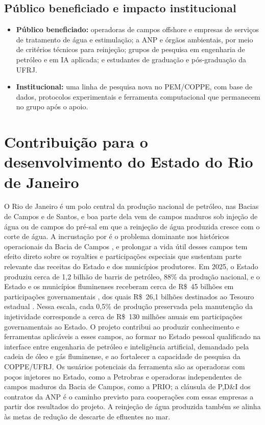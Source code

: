 \documentclass[10pt,a4paper]{article}
\newcommand{\itemedital}[1]{}
\begin{document}
\subsection{Público beneficiado e impacto institucional}\itemedital{Anexo 1 E}
\begin{itemize}
  \item \textbf{Público beneficiado:} operadoras de campos offshore e empresas de serviços de
        tratamento de água e estimulação; a ANP e órgãos ambientais, por meio de critérios
        técnicos para reinjeção; grupos de pesquisa em engenharia de petróleo e em IA aplicada;
        e estudantes de graduação e pós-graduação da UFRJ.
  \item \textbf{Institucional:} uma linha de pesquisa nova no PEM/COPPE, com base de dados,
        protocolos experimentais e ferramenta computacional que permanecem no grupo após o apoio.
\end{itemize}

\section{Contribuição para o desenvolvimento do Estado do Rio de Janeiro}\itemedital{2.16 XXII; critério 4}
O Rio de Janeiro é um polo central da produção nacional de petróleo, nas Bacias de
Campos e de Santos, e boa parte dela vem de campos maduros sob injeção de água ou de campos
do pré-sal em que a reinjeção de água produzida cresce com o corte de água. A incrustação por
 é o problema dominante nos históricos operacionais da Bacia de Campos
\cite{rocha2001,bezerra2004}, e prolongar a vida útil desses campos tem efeito direto sobre
os royalties e participações especiais que sustentam parte relevante das receitas do Estado e
dos municípios produtores. Em 2025, o Estado produziu cerca de 1,2 bilhão de barris de petróleo,
88\% da produção nacional, e o Estado e os municípios fluminenses receberam cerca de R\$~45 bilhões
em participações governamentais \cite{firjan2026anuario}, dos quais R\$~26,1 bilhões destinados ao
Tesouro estadual \cite{cbie2026royalties}. Nessa escala, cada 0,5\% de produção preservada pela
manutenção da injetividade corresponde a cerca de R\$~130 milhões anuais em participações
governamentais ao Estado. O projeto contribui ao produzir conhecimento e ferramentas
aplicáveis a esses campos, ao formar no Estado pessoal qualificado na interface entre
engenharia de petróleo e inteligência artificial, demandado pela cadeia de óleo e gás
fluminense, e ao fortalecer a capacidade de pesquisa da COPPE/UFRJ. Os usuários potenciais da ferramenta são as operadoras
com poços injetores no Estado, como a Petrobras e operadoras independentes de campos maduros da
Bacia de Campos, como a PRIO; a cláusula de P,D\&I dos contratos da ANP é o caminho previsto para
cooperações com essas empresas a partir dos resultados do projeto. A reinjeção de água produzida
também se alinha às metas de redução de descarte de efluentes no mar.
\end{document}
